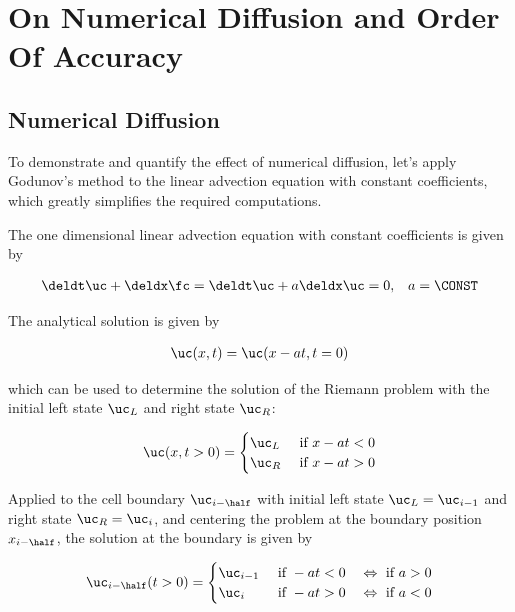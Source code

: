 \section{On Numerical Diffusion and Order Of Accuracy}\label{chap:numerical_diffusion}

\subsection{Numerical Diffusion}

To demonstrate and quantify the effect of numerical diffusion, let's apply Godunov's method to the
linear advection equation with constant coefficients, which greatly simplifies the required
computations.

The one dimensional linear advection equation with constant coefficients is given by

\begin{align}
    \deldt \uc + \deldx \fc = \deldt \uc + a \deldx \uc = 0, && a = \CONST
    \label{eq:numerical-diffusion-advection-equation}
\end{align}


The analytical solution is given by

\begin{align}
    \uc(x, t) = \uc(x - at, t=0)
\end{align}

which can be used to determine the solution of the Riemann problem with the initial left state
$\uc_L$ and right state $\uc_R$:

\begin{align}
    \uc(x, t>0) = \begin{cases}
                    \uc_L & \text{ if } x - at < 0 \\
                    \uc_R & \text{ if } x - at > 0
                  \end{cases}
\end{align}

Applied to the cell boundary $\uc_{i-\half}$ with initial left state $\uc_L = \uc_{i-1}$ and
right state $\uc_R = \uc_i$, and centering the problem at the boundary position $x_{i-\half}$,
the solution at the boundary is given by

\begin{align}
    \uc_{i-\half}(t>0) =
                \begin{cases}
                    \uc_{i-1} & \text{ if } - at < 0  \quad \Leftrightarrow \text{ if } a > 0  \\
                    \uc_{i} & \text{ if } - at > 0 \quad \Leftrightarrow \text{ if } a < 0
                \end{cases}
\end{align}

